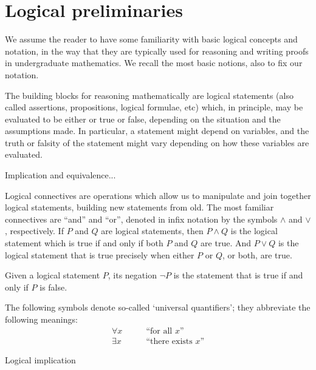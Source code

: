 

\section{Logical preliminaries}

We assume the reader to have some familiarity with basic logical concepts and notation, in the way that they are typically used for reasoning and writing proofs in undergraduate mathematics. We recall the most basic notions, also to fix our notation. 

The building blocks for reasoning mathematically are logical statements (also called assertions, propositions, logical formulae, etc) which, in principle, may be evaluated to be either or true or false, depending on the situation and the assumptions made.  In particular, a statement might depend on variables, and the truth or falsity of the statement might vary depending on how these variables are evaluated. 

Implication and equivalence... 

Logical connectives are operations which allow us to manipulate and join together logical statements, building new statements from old. The most familiar connectives are ``and'' and ``or'', denoted in infix notation by the symbols $\wedge$ and $\vee$, respectively. If $P$ and $Q$ are logical statements, then $P \wedge Q$ is the logical statement which is true if and only if both $P$ and $Q$ are true. And $P \vee Q$ is the logical statement that is true precisely when either $P$ or $Q$, or both, are true. 

Given a logical statement $P$, its negation $\lnot P$ is the statement that is true if and only if $P$ is false. 

The following symbols denote so-called `universal quantifiers'; they abbreviate the following meanings:
\begin{align}
\forall x &\quad \quad \text{``for all $x$''} \\
\exists x &\quad \quad \text{``there exists $x$''}
\end{align}

Logical implication